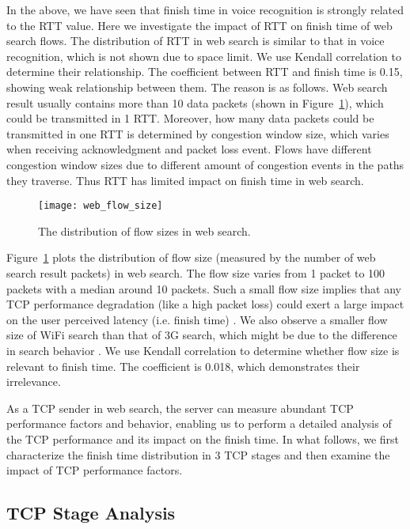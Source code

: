 In the above, we have seen that finish time in voice recognition is strongly related to the RTT value. Here we investigate the impact of RTT on finish time of web search flows. The distribution of RTT in web search is similar to that in voice recognition, which is not shown due to space limit. We use Kendall correlation to determine their relationship. The coefficient between RTT and finish time is 0.15, showing weak relationship between them. The reason is as follows. Web search result usually contains more than 10 data packets (shown in Figure~\ref{fig:web_flow_size}), which could be transmitted in 1 RTT. Moreover, how many data packets could be transmitted in one RTT is determined by congestion window size, which varies when receiving acknowledgment and packet loss event. Flows have different congestion window sizes due to different amount of congestion events in the paths they traverse. Thus RTT has limited impact on finish time in web search. 

\begin{figure}[th]
\centering
	\texttt{[image: web\_flow\_size]}
\caption{The distribution of flow sizes in web search.}
\label{fig:web_flow_size}
\end{figure}

Figure~\ref{fig:web_flow_size} plots the distribution of flow size (measured by the number of web search result packets) in web search. The flow size varies from 1 packet to 100 packets with a median around 10 packets. Such a small flow size implies that any TCP performance degradation (like a high packet loss) could exert a large impact on the user perceived latency (i.e. finish time) \cite{flach2013reducing}. We also observe a smaller flow size of WiFi search than that of 3G search, which might be due to the difference in search behavior \cite{Song:2013:EEU:2488388.2488493}. We use Kendall correlation to determine whether flow size is relevant to finish time. The coefficient is 0.018, which demonstrates their irrelevance.

As a TCP sender in web search, the server can measure abundant TCP performance factors and behavior, enabling us to perform a detailed analysis of the TCP performance and its impact on the finish time. In what follows, we first characterize the finish time distribution in 3 TCP stages and then examine the impact of TCP performance factors.

\subsection{TCP Stage Analysis}

